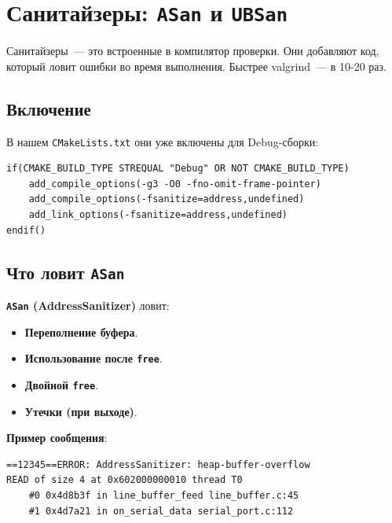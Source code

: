 \section{Санитайзеры: \texttt{ASan} и \texttt{UBSan}}
\label{sec:debug-sanitizers}

Санитайзеры~--- это встроенные в компилятор
проверки. Они добавляют код, который
ловит ошибки во время выполнения.
Быстрее valgrind~--- в 10-20 раз.

\subsection{Включение}

В нашем \texttt{CMakeLists.txt} они уже включены
для Debug-сборки:

\begin{listing}[htbp]
\begin{verbatim}
if(CMAKE_BUILD_TYPE STREQUAL "Debug" OR NOT CMAKE_BUILD_TYPE)
    add_compile_options(-g3 -O0 -fno-omit-frame-pointer)
    add_compile_options(-fsanitize=address,undefined)
    add_link_options(-fsanitize=address,undefined)
endif()
\end{verbatim}
\caption{Санитайзеры в \texttt{CMakeLists.txt}}
\label{lst:debug-sanitizers}
\end{listing}

\subsection{Что ловит \texttt{ASan}}

\textbf{\texttt{ASan} (AddressSanitizer)} ловит:

\begin{itemize}
    \item \textbf{Переполнение буфера}.
    \item \textbf{Использование после \texttt{free}}.
    \item \textbf{Двойной \texttt{free}}.
    \item \textbf{Утечки (при выходе)}.
\end{itemize}

\textbf{Пример сообщения}:

\begin{verbatim}
==12345==ERROR: AddressSanitizer: heap-buffer-overflow
READ of size 4 at 0x602000000010 thread T0
    #0 0x4d8b3f in line_buffer_feed line_buffer.c:45
    #1 0x4d7a21 in on_serial_data serial_port.c:112
\end{verbatim}

